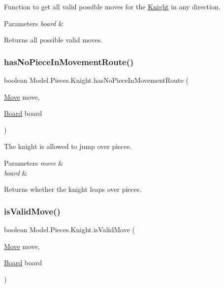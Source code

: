 Function to get all valid possible moves for the \hyperlink{class_model_1_1_pieces_1_1_knight}{Knight} in any direction. 
\begin{DoxyParams}{Parameters}
{\em board} & \\
\hline
\end{DoxyParams}
\begin{DoxyReturn}{Returns}
all possible valid moves. 
\end{DoxyReturn}
\hypertarget{class_model_1_1_pieces_1_1_knight_ae8502fc00e75878195898f12e8ada235}{}\label{class_model_1_1_pieces_1_1_knight_ae8502fc00e75878195898f12e8ada235} 
\subsubsection{\texorpdfstring{has\+No\+Piece\+In\+Movement\+Route()}{hasNoPieceInMovementRoute()}}
{\footnotesize\ttfamily boolean Model.\+Pieces.\+Knight.\+has\+No\+Piece\+In\+Movement\+Route (\begin{DoxyParamCaption}\item[{\hyperlink{class_model_1_1_move}{Move}}]{move,  }\item[{\hyperlink{class_model_1_1_board}{Board}}]{board }\end{DoxyParamCaption})}

The knight is allowed to jump over pieces. 
\begin{DoxyParams}{Parameters}
{\em move} & \\
\hline
{\em board} & \\
\hline
\end{DoxyParams}
\begin{DoxyReturn}{Returns}
whether the knight leaps over pieces. 
\end{DoxyReturn}
\hypertarget{class_model_1_1_pieces_1_1_knight_a205e4f1df4e275380734cca239495979}{}\label{class_model_1_1_pieces_1_1_knight_a205e4f1df4e275380734cca239495979} 
\subsubsection{\texorpdfstring{is\+Valid\+Move()}{isValidMove()}}
{\footnotesize\ttfamily boolean Model.\+Pieces.\+Knight.\+is\+Valid\+Move (\begin{DoxyParamCaption}\item[{\hyperlink{class_model_1_1_move}{Move}}]{move,  }\item[{\hyperlink{class_model_1_1_board}{Board}}]{board }\end{DoxyParamCaption})}

